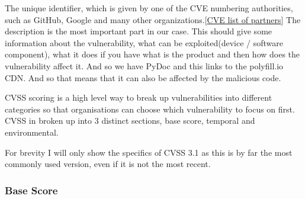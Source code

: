 \documentclass[12pt]{article}
\begin{document}
The unique identifier, which is given by one of the CVE numbering authorities, such as GitHub,
Google and many other organizations.[\href{https://www.cve.org/PartnerInformation/ListofPartners}{CVE
			list of partners}] The description is the most important part in our case. This should give some
information about the vulnerability, what can be exploited(device / software component), what it
does if  you have what is the product and then how does the vulnerability affect it. And so we have
PyDoc and this links to the polyfill.io CDN. And so that means that it can also be affected by the
malicious code.

CVSS scoring is a high level way to break up vulnerabilities into different categories so that
organisations can choose which vulnerability to focus on first. CVSS in broken up into 3 distinct sections, base score,
temporal and environmental.

For brevity I will only show the specifics of CVSS 3.1 as this is by far the most commonly used version, even if it is
not the most recent.

\subsubsection*{Base Score}
\end{document}
